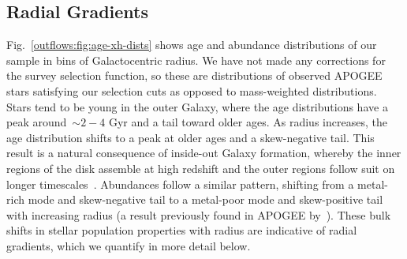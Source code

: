 \subsection{Radial Gradients}
\label{outflows:sec:empirical:gradients}

Fig.~\ref{outflows:fig:age-xh-dists} shows age and abundance distributions of
our sample in bins of Galactocentric radius.
We have not made any corrections for the survey selection function, so these
are distributions of observed APOGEE stars satisfying our selection cuts as
opposed to mass-weighted distributions.
Stars tend to be young in the outer Galaxy, where the age distributions have a
peak around~$\sim$$2-4$ Gyr and a tail toward older ages.
As radius increases, the age distribution shifts to a peak at older ages and a
skew-negative tail.
This result is a natural consequence of inside-out Galaxy formation, whereby
the inner regions of the disk assemble at high redshift and the outer regions
follow suit on longer timescales~\citep[e.g.,][]{White1991, Bird2013}.
Abundances follow a similar pattern, shifting from a metal-rich mode and
skew-negative tail to a metal-poor mode and skew-positive tail with increasing
radius (a result previously found in APOGEE by~\citealt{Hayden2015}).
These bulk shifts in stellar population properties with radius are indicative
of radial gradients, which we quantify in more detail below.


